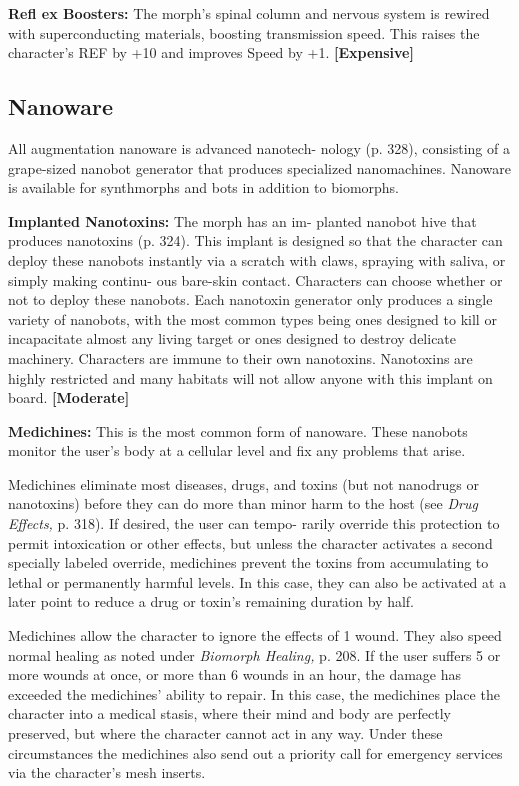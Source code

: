 \textbf{Refl ex Boosters:} The morph's spinal column and 
nervous system is rewired with superconducting 
materials, boosting transmission speed. This raises 
the character's REF by +10 and improves Speed by 
+1. \textbf{[Expensive]}

\subsection{Nanoware}

All augmentation nanoware is advanced nanotech-
nology (p. 328), consisting of a grape-sized nanobot 
generator that produces specialized nanomachines. 
Nanoware is available for synthmorphs and bots in 
addition to biomorphs.

\textbf{Implanted Nanotoxins:} The morph has an im-
planted nanobot hive that produces nanotoxins (p. 
324). This implant is designed so that the character 
can deploy these nanobots instantly via a scratch with 
claws, spraying with saliva, or simply making continu-
ous bare-skin contact. Characters can choose whether 
or not to deploy these nanobots. Each nanotoxin 
generator only produces a single variety of nanobots, 
with the most common types being ones designed to 
kill or incapacitate almost any living target or ones 
designed to destroy delicate machinery. Characters 
are immune to their own nanotoxins. Nanotoxins 
are highly restricted and many habitats will not allow 
anyone with this implant on board. \textbf{[Moderate]}

\textbf{Medichines:  }This is the most common form of 
nanoware. These nanobots monitor the user's body at 
a cellular level and fix any problems that arise. 

Medichines eliminate most diseases, drugs, and 
toxins (but not nanodrugs or nanotoxins) before 
they can do more than minor harm to the host (see 
\textit{Drug Effects,} p. 318). If desired, the user can tempo-
rarily override this protection to permit intoxication 
or other effects, but unless the character activates a 
second specially labeled override, medichines prevent 
the toxins from accumulating to lethal or permanently 
harmful levels. In this case, they can also be activated 
at a later point to reduce a drug or toxin's remaining 
duration by half. 

Medichines allow the character to ignore the effects 
of 1 wound. They also speed normal healing as noted 
under \textit{Biomorph Healing,} p. 208. If the user suffers 
5 or more wounds at once, or more than 6 wounds 
in an hour, the damage has exceeded the medichines' 
ability to repair. In this case, the medichines place the 
character into a medical stasis, where their mind and 
body are perfectly preserved, but where the character 
cannot act in any way. Under these circumstances the 
medichines also send out a priority call for emergency 
services via the character's mesh inserts.

